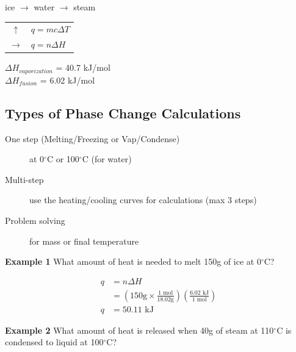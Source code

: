 \documentclass[11pt]{article}
\begin{document}
    \begin{center}
        ice $\rightarrow$ water $\rightarrow$ steam

        \begin{tabular}{c l}
            $\uparrow$ & $q=mc\Delta T$ \\
            $\rightarrow$ & $q=n\Delta H$
        \end{tabular}

        $\Delta H_{vaporization}$ = 40.7 kJ/mol \\
        $\Delta H_{fusion}$ = 6.02 kJ/mol
    \end{center}

    \subsection{Types of Phase Change Calculations}
    \begin{description}
        \item[One step (Melting/Freezing or Vap/Condense)] at 0$^\circ$C or 100$^\circ$C (for water)
        \item[Multi-step] use the heating/cooling curves for calculations (max 3 steps)
        \item[Problem solving] for mass or final temperature 
    \end{description}

    \textbf{Example 1} What amount of heat is needed to melt 150g of ice at 0$^\circ$C?

    \begin{equation*}
        \begin{aligned}
            q&=n\Delta H \\
            &= \left(150\text{g} \times \frac{1 \text{ mol}}{18.02 \text{g}}\right)\left(\frac{6.02\text{ kJ}}{1 \text{ mol}}\right) \\
            q&=50.11 \text{ kJ}
        \end{aligned}
    \end{equation*}

    \textbf{Example 2} What amount of heat is released when 40g of steam at 110$^\circ$C is condensed to liquid at 100$^\circ$C?
\end{document}
